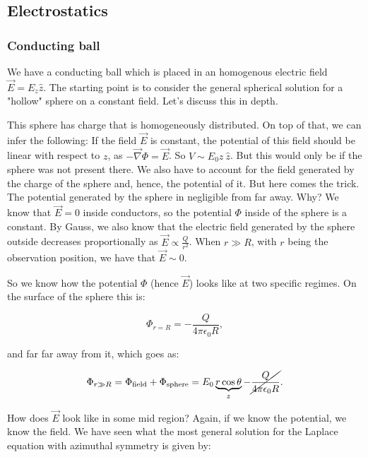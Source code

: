 \subsection{Electrostatics}

\subsubsection{Conducting ball}\label{Conducting ball}
We have a conducting ball which is placed in an homogenous electric field $\vec{E}=E_{z}\hat{z}$. The starting point is to consider the general spherical solution for a "hollow" sphere on a constant field. Let's discuss this in depth.

This sphere has charge that is homogeneously distributed.  On top of that, we can infer the following: If the field $\vec{E}$ is constant, the potential of this field should be linear with respect to $z$, as $-\vec{\nabla} \Phi= \vec{E}$. So $V \sim E_{0} z \: \hat{z}$.  But this would only be if the sphere was not present there. We also have to account for the field generated by the charge of the sphere and, hence, the potential of it. But here comes the trick. The potential generated by the sphere in negligible from far away. Why? We know that $\vec{E}=0$ inside conductors, so the potential $\Phi$ inside of  the sphere is a constant. By Gauss, we also know that the electric field generated by the sphere outside decreases proportionally as $\vec{E} \propto \tfrac{Q}{r^{2}}$.  When $r \gg R$, with $r$ being the observation position, we have that $\vec{E} \sim 0$.

So we know how the potential $\Phi$ (hence $\vec{E}$) looks like at two specific regimes. On the surface of the sphere this is:

\begin{equation}
	\Phi_{r=R} = -\frac{Q}{4 \pi \epsilon_{0} R},
\end{equation}

and far far away from it, which goes as:

\begin{equation}
	\Phi_{r\gg R} = \Phi_{\text{field}} + \Phi_{\text{sphere}} = E_{0} \underbrace{r \cos \theta}_{z} - \cancel{\frac{Q}{4 \pi \epsilon_{0} R}}.
\end{equation}

How does $\vec{E}$ look like in some mid region? Again, if we know the potential, we know the field. We have seen what the most general solution for the Laplace equation with azimuthal symmetry is given by:


